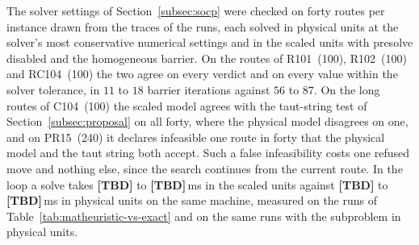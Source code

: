 \documentclass[11pt]{article}
\newcommand{\tbd}{\textbf{[TBD]}}   %
\begin{document}
The solver settings of Section~\ref{subsec:socp} were checked on forty routes per instance drawn from the traces of the runs, each solved in physical units at the solver's most conservative numerical settings and in the scaled units with presolve disabled and the homogeneous barrier. On the routes of R101~(100), R102~(100) and RC104~(100) the two agree on every verdict and on every value within the solver tolerance, in $11$ to $18$ barrier iterations against $56$ to $87$. On the long routes of C104~(100) the scaled model agrees with the taut-string test of Section~\ref{subsec:proposal} on all forty, where the physical model disagrees on one, and on PR15~(240) it declares infeasible one route in forty that the physical model and the taut string both accept. Such a false infeasibility costs one refused move and nothing else, since the search continues from the current route. In the loop a solve takes \tbd{} to \tbd{}\,ms in the scaled units against \tbd{} to \tbd{}\,ms in physical units on the same machine, measured on the runs of Table~\ref{tab:matheuristic-vs-exact} and on the same runs with the subproblem in physical units.%
\end{document}
